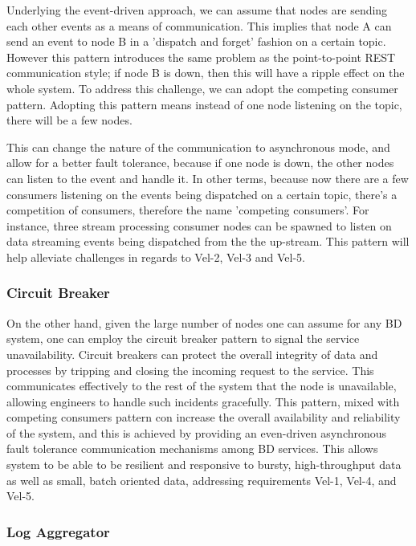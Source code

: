 \documentclass{bmcart}
\begin{document}
Underlying the event-driven approach, we can assume that nodes are sending each other events as a means of communication. This implies that node A can send an event to node B in a 'dispatch and forget' fashion on a certain topic. However this pattern introduces the same problem as the point-to-point REST communication style; if node B is down, then this will have a ripple effect on the whole system. To address this challenge, we can adopt the competing consumer pattern. Adopting this pattern means instead of one node listening on the topic, there will be a few nodes. 

This can change the nature of the communication to asynchronous mode, and allow for a better fault tolerance, because if one node is down, the other nodes can listen to the event and handle it. In other terms, because now there are a few consumers listening on the events being dispatched on a certain topic, there's a competition of consumers, therefore the name 'competing consumers'. For instance, three stream processing consumer nodes can be spawned to listen on data streaming events being dispatched from the the up-stream. This pattern will help alleviate challenges in regards to Vel-2, Vel-3 and Vel-5.

\subsubsection{Circuit Breaker}

On the other hand, given the large number of nodes one can assume for any BD system, one can employ the circuit breaker pattern to signal the service unavailability. Circuit breakers can protect the overall integrity of data and processes by tripping and closing the incoming request to the service. This communicates effectively to the rest of the system that the node is unavailable, allowing engineers to handle such incidents gracefully. This pattern, mixed with competing consumers pattern con increase the overall availability and reliability of the system, and this is achieved by providing an even-driven asynchronous fault tolerance communication mechanisms among BD services. This allows system to be able to be resilient and responsive to bursty, high-throughput data as well as small, batch oriented data, addressing requirements Vel-1, Vel-4, and Vel-5. 
    
\subsubsection{Log Aggregator}
\end{document}
